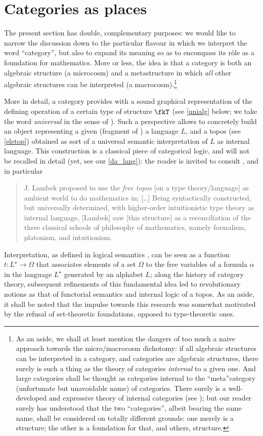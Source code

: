 \section{Categories as places}\label{as_places}
The present section has double, complementary purposes: we would like to narrow the discussion down to the particular flavour in which we interpret the word ``category'', but also to expand its meaning so as to encompass its r\^ole as a foundation for mathematics. More or less, the idea is that a category is both an algebraic structure (a microcosm) and a metastructure in which \emph{all} other algebraic structures can be interpreted (a macrocosm).\footnote{As an aside, we shall at least mention the dangers of too much a naive approach towards the micro/macrocosm dichotomy: if all algebraic structures can be interpreted in a category, and categories are algebraic structures, there surely is such a thing as the theory of categories \emph{internal} to a given one. And large categories shall be thought as categories internal to the ``meta''category (unfortunate but unavoidable name) of categories. There surely is a well-developed and expressive theory of internal categories (see \cite[8]{Bor1}); but our reader surely has understood that the two ``categories'', albeit bearing the same name, shall be considered on totally different grounds: one merely is a structure; the other is a foundation for that, and others, structure.}

More in detail, a category provides with a sound graphical representation of the defining operation of a certain type of structure $\fkT$ (see \autoref{unialg} below; we take the word \emph{universal} in the sense of \cite[XV.1]{grillet2007abstract}).
Such a perspective allows to concretely build an object representing a given (fragment of ) a language $L$, and a topos (see \autoref{eletop}) obtained as sort of a universal semantic interpretation of $L$ as internal language. This construction is a classical piece of categorical logic, and will not be recalled in detail (yet, see our \autoref{da_lang}): the reader is invited to consult \cite[II.12, 13, 14]{lambek1988introduction}, and in particular
\begin{quote}
	J. Lambek proposed to use the \emph{free topos} [on a type theory/language] as ambient world to do mathematics in; [\dots\unkern] Being syntactically constructed, but universally determined, with higher-order intuitionistic type theory as internal language, [Lambek] saw [this structure] as a reconciliation of the three classical schools of philosophy of mathematics, namely formalism, platonism, and intuitionism. \hfill\cite{}
\end{quote}
Interpretation, as defined in logical semantics \cite{gamut1991logic}, can be seen as a function $t: L^\star \to \Omega$ that associates elements of a set $\Omega$ to the free variables of a formula $\alpha$ in the language $L^\star$ generated by an alphabet $L$; along the history of category theory, subsequent refinements of this fundamental idea led to revolutionary notions as that of functorial semantics and internal logic of a topos.
As an aside, it shall be noted that the impulse towards this research was somewhat motivated by the refusal of set-theoretic foundations, opposed to type-theoretic ones.

